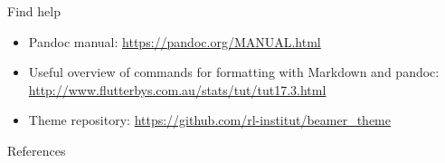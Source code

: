 \documentclass[ignorenonframetext,aspectratio=169]{beamer}
\begin{document}
\begin{frame}{Find help}

\begin{itemize}
\item Pandoc manual: \url{https://pandoc.org/MANUAL.html}
\item Useful overview of commands for formatting with Markdown and pandoc:
  \url{http://www.flutterbys.com.au/stats/tut/tut17.3.html}
\item Theme repository: \url{https://github.com/rl-institut/beamer_theme}
\end{itemize}

\end{frame}


\begin{frame}[plain]{}

\insertendpagecontent

\end{frame}

\begin{frame}{References}

 
\end{frame}
\end{document}
